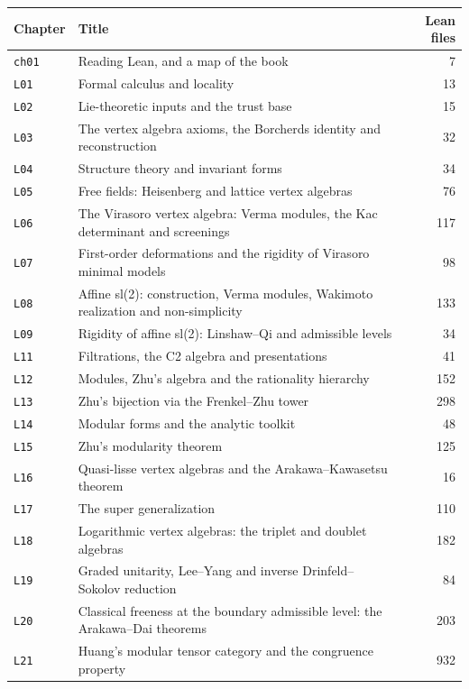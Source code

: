 {\small\begin{longtable}{l>{\raggedright\arraybackslash}p{}r}\toprule
Chapter & Title & Lean files\\\midrule\endhead
\texttt{ch01} & Reading Lean, and a map of the book & 7 \\
\texttt{L01} & Formal calculus and locality & 13 \\
\texttt{L02} & Lie-theoretic inputs and the trust base & 15 \\
\texttt{L03} & The vertex algebra axioms, the Borcherds identity and reconstruction & 32 \\
\texttt{L04} & Structure theory and invariant forms & 34 \\
\texttt{L05} & Free fields: Heisenberg and lattice vertex algebras & 76 \\
\texttt{L06} & The Virasoro vertex algebra: Verma modules, the Kac determinant and screenings & 117 \\
\texttt{L07} & First-order deformations and the rigidity of Virasoro minimal models & 98 \\
\texttt{L08} & Affine sl(2): construction, Verma modules, Wakimoto realization and non-simplicity & 133 \\
\texttt{L09} & Rigidity of affine sl(2): Linshaw--Qi and admissible levels & 34 \\
\texttt{L11} & Filtrations, the C2 algebra and presentations & 41 \\
\texttt{L12} & Modules, Zhu's algebra and the rationality hierarchy & 152 \\
\texttt{L13} & Zhu's bijection via the Frenkel--Zhu tower & 298 \\
\texttt{L14} & Modular forms and the analytic toolkit & 48 \\
\texttt{L15} & Zhu's modularity theorem & 125 \\
\texttt{L16} & Quasi-lisse vertex algebras and the Arakawa--Kawasetsu theorem & 16 \\
\texttt{L17} & The super generalization & 110 \\
\texttt{L18} & Logarithmic vertex algebras: the triplet and doublet algebras & 182 \\
\texttt{L19} & Graded unitarity, Lee--Yang and inverse Drinfeld--Sokolov reduction & 84 \\
\texttt{L20} & Classical freeness at the boundary admissible level: the Arakawa--Dai theorems & 203 \\
\texttt{L21} & Huang's modular tensor category and the congruence property & 932 \\

\end{longtable}}
